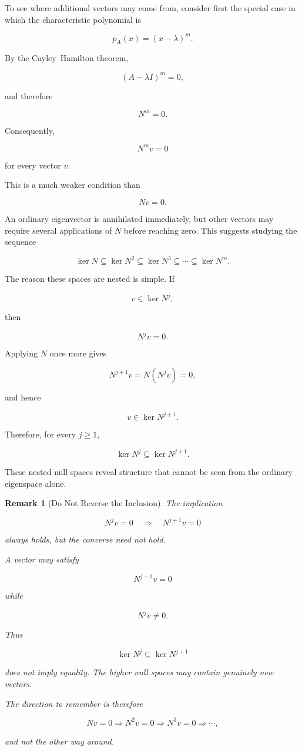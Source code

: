 \documentclass[11pt]{article}
\newtheorem{remark}[theorem]{Remark}
\begin{document}
To see where additional vectors may come from, consider first the
special case in which the characteristic polynomial is

\[
p_A(x)=(x-\lambda)^m.
\]

By the Cayley--Hamilton theorem,

\[
(A-\lambda I)^m=0,
\]

and therefore

\[
\boxed{
N^m=0.
}
\]

Consequently,

\[
N^m v=0
\]

for every vector \(v\).

This is a much weaker condition than

\[
Nv=0.
\]

An ordinary eigenvector is annihilated immediately, but other vectors
may require several applications of \(N\) before reaching zero.  This
suggests studying the sequence

\[
\boxed{
\ker N
\subseteq
\ker N^2
\subseteq
\ker N^3
\subseteq
\cdots
\subseteq
\ker N^m.
}
\]

The reason these spaces are nested is simple.  If

\[
v\in\ker N^j,
\]

then

\[
N^jv=0.
\]

Applying \(N\) once more gives

\[
N^{j+1}v=N(N^jv)=0,
\]

and hence

\[
v\in\ker N^{j+1}.
\]

Therefore, for every \(j\geq1\),

\[
\boxed{
\ker N^j\subseteq\ker N^{j+1}.
}
\]

These nested null spaces reveal structure that cannot be seen from the
ordinary eigenspace alone.

\begin{remark}[Do Not Reverse the Inclusion]
The implication

\[
N^jv=0
\quad\Longrightarrow\quad
N^{j+1}v=0
\]

always holds, but the converse need not hold.

A vector may satisfy

\[
N^{j+1}v=0
\]

while

\[
N^jv\neq0.
\]

Thus

\[
\ker N^j
\subseteq
\ker N^{j+1}
\]

does not imply equality.  The higher null spaces may contain genuinely
new vectors.

The direction to remember is therefore

\[
\boxed{
Nv=0
\Longrightarrow
N^2v=0
\Longrightarrow
N^3v=0
\Longrightarrow
\cdots,
}
\]

and not the other way around.
\end{remark}
\end{document}
